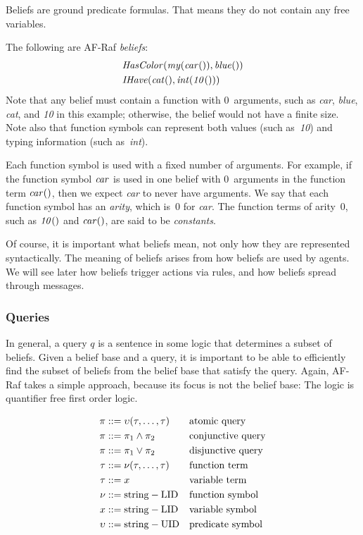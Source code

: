 \documentclass[a4paper,12pt,oneside,fleqn]{book} %
\begin{document}
Beliefs are ground predicate formulas. That means they do not contain any
free variables.

\begin{example}
The following are AF-Raf \emph{beliefs}:
\begin{align}
&{\it HasColor}({\it my}({\it car}()), {\it blue}()) \\
&{\it IHave}({\it cat}(), {\it int}({\it 10}()))
\end{align}
Note that any belief must contain a function with $0$~arguments, such as
{\it car}, {\it blue}, {\it cat}, and {\it 10\/} in this example;
otherwise, the belief would not have a finite size.  Note also that
function symbols can represent both values (such as~{\it 10\/}) and typing
information (such as~{\it int\/}).
\end{example}

Each function symbol is used with a fixed number of arguments.  For
example, if the function symbol ${\it car}$ is used in one belief with
$0$~arguments in the function term ${\it car}()$, then we expect {\it
car\/} to never have arguments.  We say that each function symbol has an
\emph{arity}, which is~$0$ for {\it car}.  The function terms of arity~$0$,
such as ${\it 10}()$ and ${\it car}()$, are said to be \emph{constants}.

\begin{remark}
Of course, it is important what beliefs mean, not only how they are
represented syntactically.  The meaning of beliefs arises from how beliefs
are used by agents.  We will see later how beliefs trigger actions via
rules, and how beliefs spread through messages.
\end{remark}

\subsubsection{Queries}

In general, a query $q$ is a sentence in some logic that determines a
subset of beliefs.  Given a belief base and a query, it is important to be
able to efficiently find the subset of beliefs from the belief base that
satisfy the query.  Again, AF-Raf takes a simple approach, because its
focus is not the belief base: The logic is quantifier free first order
logic.


\begin{align}
\pi &::= \upsilon(\tau,\ldots,\tau) && \text{atomic query}
\\
\pi &::= \pi_1 \land \pi_2 && \text{conjunctive query}
\\
\pi &::= \pi_1 \lor \pi_2 && \text{disjunctive query}
\\
\tau &::= \nu(\tau,\ldots,\tau) && \text{function term}
\\
\tau &::= x && \text{variable term}
\\
\nu  &::= {\rm string-LID} &&\text{function symbol}
\\
x &::= {\rm string-LID} && \text{variable symbol}
\\
\upsilon  &::= {\rm string-UID} &&\text{predicate symbol}
\end{align}
\end{document}
